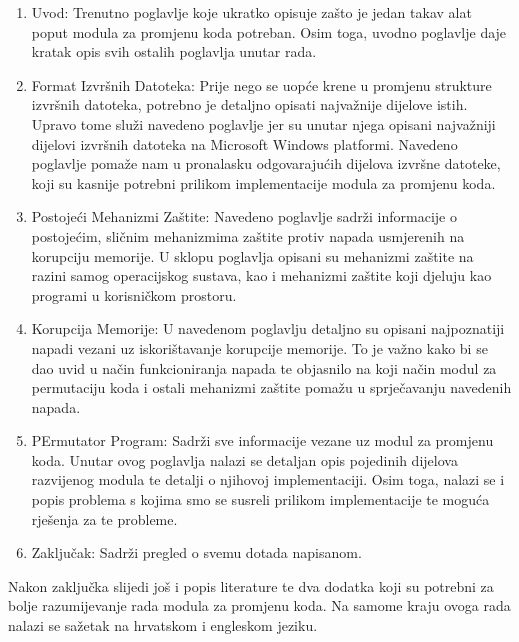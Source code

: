 \documentclass[times, utf8, diplomski, numeric]{fer}
\begin{document}
\begin{enumerate}
\item Uvod: Trenutno poglavlje koje ukratko opisuje zašto je			%
jedan takav alat poput modula za promjenu koda potreban. Osim
toga, uvodno poglavlje daje kratak opis svih ostalih poglavlja
unutar rada.

\item Format Izvršnih Datoteka: Prije nego se uopće krene u
promjenu strukture izvršnih datoteka, potrebno je detaljno
opisati najvažnije dijelove istih.  Upravo tome služi navedeno
poglavlje jer su unutar njega opisani najvažniji dijelovi
izvršnih datoteka na Microsoft Windows platformi. Navedeno
poglavlje pomaže nam u pronalasku odgovarajućih dijelova izvršne
datoteke, koji su kasnije potrebni prilikom implementacije modula
za promjenu koda.

\item Postojeći Mehanizmi Zaštite: Navedeno poglavlje sadrži
informacije o postojećim, sličnim mehanizmima zaštite protiv
napada usmjerenih na korupciju memorije. U sklopu poglavlja
opisani su mehanizmi zaštite na razini samog operacijskog
sustava, kao i mehanizmi zaštite koji djeluju kao programi u			%
korisničkom prostoru.

\item Korupcija Memorije: U navedenom poglavlju detaljno su
opisani najpoznatiji napadi vezani uz iskorištavanje korupcije
memorije.  To je važno kako bi se dao 
uvid u način funkcioniranja napada te objasnilo na koji
način modul za permutaciju koda i ostali mehanizmi zaštite pomažu
u sprječavanju navedenih napada.

\item PErmutator Program: Sadrži sve informacije vezane uz modul
za promjenu koda. Unutar ovog poglavlja nalazi se detaljan opis
pojedinih dijelova razvijenog modula te detalji o njihovoj
implementaciji. Osim toga, nalazi se i popis problema s kojima
smo se susreli prilikom implementacije te moguća rješenja za te
probleme.

\item Zaključak: Sadrži pregled o svemu dotada napisanom.			%
\end{enumerate}

Nakon zaključka slijedi još i popis literature te dva dodatka
koji su potrebni za bolje razumijevanje rada modula za promjenu
koda. Na samome kraju ovoga rada nalazi se sažetak na hrvatskom i
engleskom jeziku.
\end{document}
